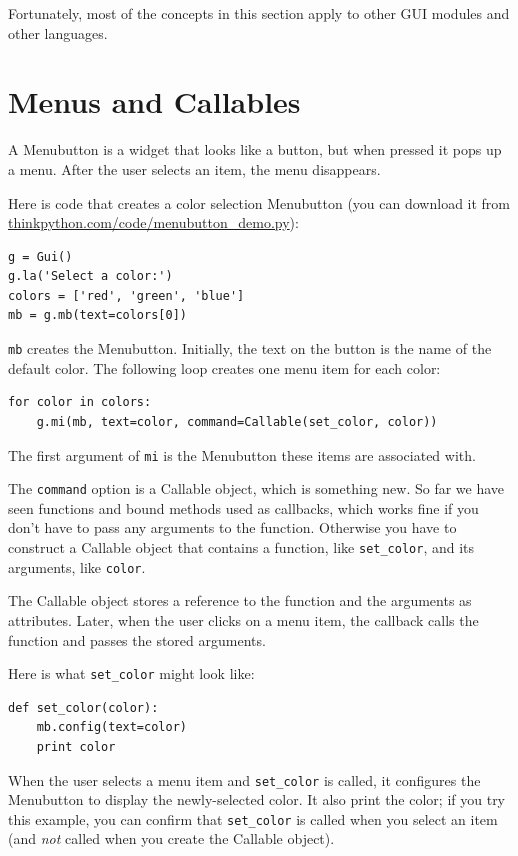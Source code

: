 \documentclass[10pt]{book}
\begin{document}

Fortunately, most of the concepts in this section apply to
other GUI modules and other languages.


\section{Menus and Callables}


A Menubutton is a widget that looks like a button, but when pressed
it pops up a menu.  After the user selects an item, the menu
disappears.

Here is code that creates a color selection Menubutton
(you can download it from \url{thinkpython.com/code/menubutton_demo.py}):


\beforeverb
\begin{verbatim}
g = Gui()
g.la('Select a color:')
colors = ['red', 'green', 'blue']
mb = g.mb(text=colors[0])
\end{verbatim}
\afterverb
%
{\tt mb} creates the Menubutton.  Initially, the text on the button is
the name of the default color.  The following loop creates one menu
item for each color:

\beforeverb
\begin{verbatim}
for color in colors:
    g.mi(mb, text=color, command=Callable(set_color, color))
\end{verbatim}
\afterverb
%
The first argument of {\tt mi} is the Menubutton these items are
associated with.


The {\tt command} option is a Callable object, which is something new.
So far we have seen functions and bound methods used as callbacks,
which works fine if you don't have to pass any arguments to
the function.  Otherwise you have to construct a Callable object
that contains a function, like \verb"set_color", and its arguments,
like {\tt color}.

The Callable object stores a reference to the function and the
arguments as attributes.  Later, when the user clicks on a menu
item, the callback calls the function and passes the stored
arguments.

Here is what \verb"set_color" might look like:

\beforeverb
\begin{verbatim}
def set_color(color):
    mb.config(text=color)
    print color
\end{verbatim}
\afterverb
%
When the user selects a menu item and \verb"set_color" is called,
it configures the Menubutton to display the newly-selected color.
It also print the color; if you try this example, you can confirm that
\verb"set_color" is called when you select an item (and {\em not}
called when you create the Callable object).
\end{document}
